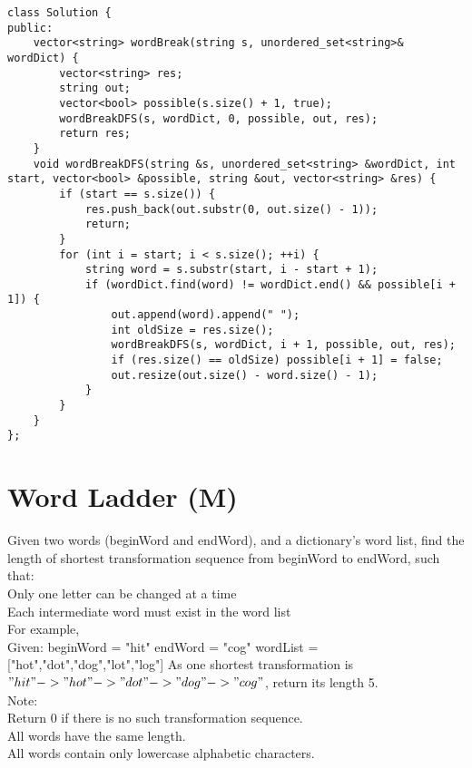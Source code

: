 \begin{lstlisting}
class Solution {
public:
    vector<string> wordBreak(string s, unordered_set<string>& wordDict) {
        vector<string> res;
        string out;
        vector<bool> possible(s.size() + 1, true);
        wordBreakDFS(s, wordDict, 0, possible, out, res);
        return res;
    }
    void wordBreakDFS(string &s, unordered_set<string> &wordDict, int start, vector<bool> &possible, string &out, vector<string> &res) {
        if (start == s.size()) {
            res.push_back(out.substr(0, out.size() - 1));
            return;
        }
        for (int i = start; i < s.size(); ++i) {
            string word = s.substr(start, i - start + 1);
            if (wordDict.find(word) != wordDict.end() && possible[i + 1]) {
                out.append(word).append(" ");
                int oldSize = res.size();
                wordBreakDFS(s, wordDict, i + 1, possible, out, res);
                if (res.size() == oldSize) possible[i + 1] = false;
                out.resize(out.size() - word.size() - 1);
            }
        }
    }
};
\end{lstlisting}


\section{Word Ladder (M)}
Given two words (beginWord and endWord), and a dictionary's word list, find the length of shortest transformation sequence from beginWord to endWord, such that:\\
    Only one letter can be changed at a time\\
    Each intermediate word must exist in the word list\\

For example,\\
Given:
beginWord = "hit"
endWord = "cog"
wordList = ["hot","dot","dog","lot","log"]
As one shortest transformation is $"hit" -> "hot" -> "dot" -> "dog" -> "cog"$,
return its length 5.\\

Note:\\
    Return 0 if there is no such transformation sequence.\\
    All words have the same length.\\
    All words contain only lowercase alphabetic characters.\

